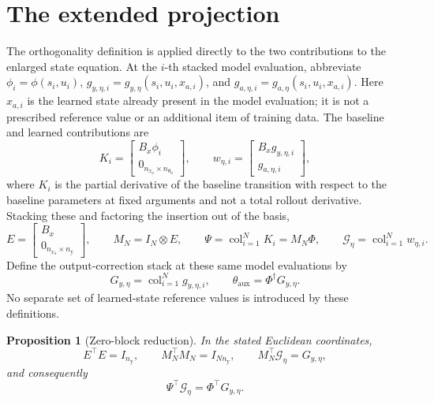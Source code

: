 \documentclass[11pt,a4paper]{article}
\newcommand{\col}{\operatorname{col}}
\newtheorem{proposition}{Proposition}
\theoremstyle{remark}
\begin{document}
\section{The extended projection}\label{sec:projection}
The orthogonality definition is applied directly to the two contributions to the enlarged state
equation. At the \(i\)-th stacked model evaluation, abbreviate
\(\phi_i=\phi(s_i,u_i)\),
\(g_{y,\eta,i}=g_{y,\eta}(s_i,u_i,x_{a,i})\), and
\(g_{a,\eta,i}=g_{a,\eta}(s_i,u_i,x_{a,i})\). Here \(x_{a,i}\) is the learned state already present
in the model evaluation; it is not a prescribed reference value or an additional item of training
data. The baseline and learned contributions are
\begin{equation*}
K_i=\begin{bmatrix}B_x\phi_i\\0_{n_{x_a}\times n_{\theta_{\mathrm b}}}\end{bmatrix},
\qquad
w_{\eta,i}=\begin{bmatrix}B_xg_{y,\eta,i}\\g_{a,\eta,i}\end{bmatrix},
\end{equation*}
where \(K_i\) is the partial derivative of the baseline transition with respect to the baseline
parameters at fixed arguments and not a total rollout derivative. Stacking these and factoring the
insertion out of the basis,
\begin{equation}\label{eq:augmentedstacks}
E=\begin{bmatrix}B_x\\0_{n_{x_a}\times n_{\mathrm y}}\end{bmatrix},\qquad
M_N=I_N\otimes E,\qquad
\Psi=\col_{i=1}^NK_i=M_N\Phi,\qquad
\mathcal G_\eta=\col_{i=1}^Nw_{\eta,i}.
\end{equation}
Define the output-correction stack at these same model evaluations by
\begin{equation*}
G_{y,\eta}=\col_{i=1}^N g_{y,\eta,i},\qquad
\theta_{\mathrm{aux}}=\Phi^\dagger G_{y,\eta}.
\end{equation*}
No separate set of learned-state reference values is introduced by these definitions.

\begin{proposition}[Zero-block reduction]\label{prop:zero}
In the stated Euclidean coordinates,
\begin{equation*}
E^\top E=I_{n_{\mathrm y}},\qquad M_N^\top M_N=I_{Nn_{\mathrm y}},\qquad
M_N^\top\mathcal G_\eta=G_{y,\eta},
\end{equation*}
and consequently
\begin{equation}\label{eq:zeroreduction}
\Psi^\top\mathcal G_\eta=\Phi^\top G_{y,\eta}.
\end{equation}
\end{proposition}
\end{document}
